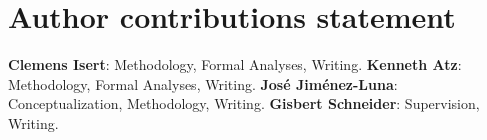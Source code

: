 \section*{Author contributions statement}
\textbf{Clemens Isert}: Methodology, Formal Analyses, Writing. \textbf{Kenneth Atz}: Methodology, Formal Analyses, Writing. \textbf{José Jiménez-Luna}: Conceptualization, Methodology, Writing. \textbf{Gisbert Schneider}: Supervision, Writing. 


